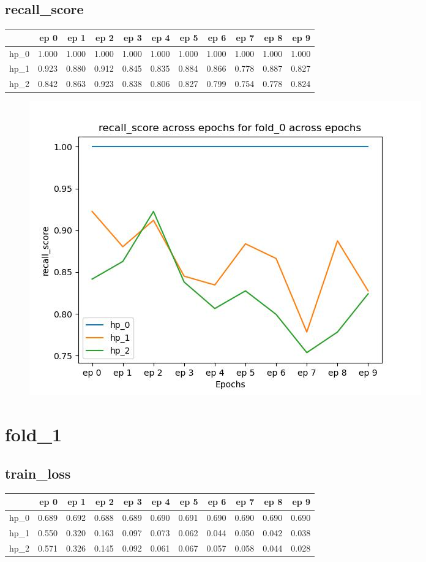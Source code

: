 \documentclass{article}
\begin{document}
\subsection{recall\_score}
\begin{tabular}{lrrrrrrrrrr}
\toprule
{} &   ep 0 &   ep 1 &   ep 2 &   ep 3 &   ep 4 &   ep 5 &   ep 6 &   ep 7 &   ep 8 &   ep 9 \\
\midrule
hp\_0 &  1.000 &  1.000 &  1.000 &  1.000 &  1.000 &  1.000 &  1.000 &  1.000 &  1.000 &  1.000 \\
hp\_1 &  0.923 &  0.880 &  0.912 &  0.845 &  0.835 &  0.884 &  0.866 &  0.778 &  0.887 &  0.827 \\
hp\_2 &  0.842 &  0.863 &  0.923 &  0.838 &  0.806 &  0.827 &  0.799 &  0.754 &  0.778 &  0.824 \\
\bottomrule
\end{tabular}

\begin{figure}[H]
\includegraphics[scale = 0.75]{fold_0/recall_score}
\end{figure}
\section{fold\_1}
\subsection{train\_loss}
\begin{tabular}{lrrrrrrrrrr}
\toprule
{} &   ep 0 &   ep 1 &   ep 2 &   ep 3 &   ep 4 &   ep 5 &   ep 6 &   ep 7 &   ep 8 &   ep 9 \\
\midrule
hp\_0 &  0.689 &  0.692 &  0.688 &  0.689 &  0.690 &  0.691 &  0.690 &  0.690 &  0.690 &  0.690 \\
hp\_1 &  0.550 &  0.320 &  0.163 &  0.097 &  0.073 &  0.062 &  0.044 &  0.050 &  0.042 &  0.038 \\
hp\_2 &  0.571 &  0.326 &  0.145 &  0.092 &  0.061 &  0.067 &  0.057 &  0.058 &  0.044 &  0.028 \\
\bottomrule
\end{tabular}
\end{document}
